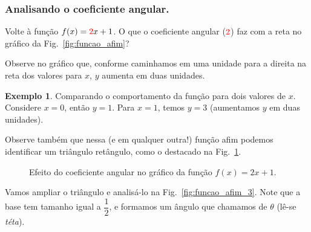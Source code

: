 \documentclass[12pt,openright,twoside,a4paper]{article}
\theoremstyle{definition}
\newtheorem{example}{Exemplo}[section]
\begin{document}
	\subsubsection{Analisando o coeficiente angular.}\label{tema:coef_angular}
	
	Volte à função $f(x) = \textcolor{red}{2}x + 1$. O que o coeficiente angular ($\textcolor{red}{2}$) faz com a reta no gráfico da Fig.~\ref{fig:funcao_afim}?
	
	Observe no gráfico que, conforme caminhamos em uma unidade para a direita na reta dos valores para $x$, $y$ aumenta em duas unidades.
	
	\begin{example}\label{ex:funcao_afim_2}Comparando o comportamento da função para dois valores de $x$. Considere $x = 0$, então $y = 1$. Para $x=1$, temos $y=3$ (aumentamos $y$ em duas unidades).
	\end{example}
	
	Observe também que nessa (e em qualquer outra!) função afim podemos identificar um triângulo retângulo, como o destacado na Fig.~\ref{fig:funcao_afim_2}.
	
	\begin{figure}[h]
		\centering
		\caption{Efeito do coeficiente angular no gráfico da função $f(x) = 2x + 1$.}
		\label{fig:funcao_afim_2}
	\end{figure}
	
	Vamos ampliar o triângulo e analisá-lo na Fig.~\ref{fig:funcao_afim_3}. Note que a base tem tamanho igual a $\displaystyle \dfrac{1}{2}$, e formamos um ângulo que chamamos de $\theta$ (lê-se \textit{téta}).
	
\end{document}
